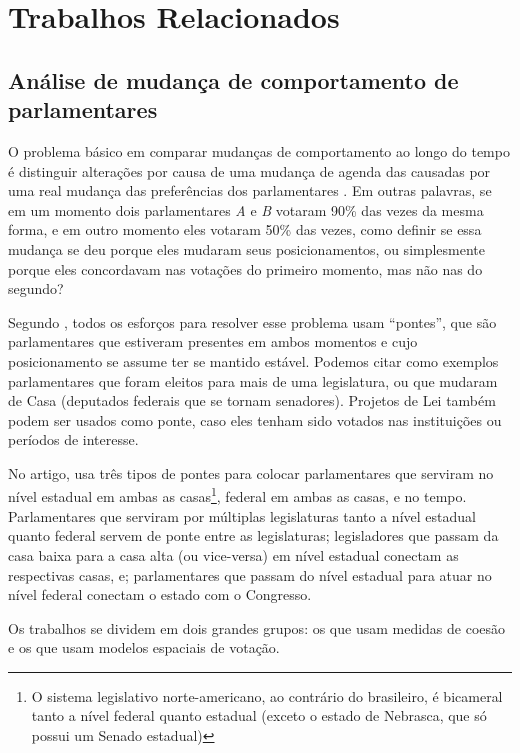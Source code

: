\chapter{Trabalhos Relacionados}\label{cap:relacionados}


\section{Análise de mudança de comportamento de parlamentares}

O problema básico em comparar mudanças de comportamento ao longo do tempo é
distinguir alterações por causa de uma mudança de agenda das causadas por uma
real mudança das preferências dos parlamentares \cite{Bailey2007}. Em outras
palavras, se em um momento dois parlamentares \emph{A} e \emph{B} votaram 90\%
das vezes da mesma forma, e em outro momento eles votaram 50\% das vezes, como
definir se essa mudança se deu porque eles mudaram seus posicionamentos, ou
simplesmente porque eles concordavam nas votações do primeiro momento, mas não
nas do segundo?

Segundo , todos os esforços para resolver esse problema
usam ``pontes'', que são parlamentares que estiveram presentes em ambos
momentos e cujo posicionamento se assume ter se mantido estável. Podemos citar
como exemplos parlamentares que foram eleitos para mais de uma legislatura, ou
que mudaram de Casa (deputados federais que se tornam senadores). Projetos de
Lei também podem ser usados como ponte, caso eles tenham sido votados nas
instituições ou períodos de interesse.

No artigo,  usa três tipos de pontes para colocar
parlamentares que serviram no nível estadual em ambas as casas\footnote{O
sistema legislativo norte-americano, ao contrário do brasileiro, é bicameral
tanto a nível federal quanto estadual (exceto o estado de Nebrasca, que só
possui um Senado estadual)}, federal em ambas as casas, e no tempo.
Parlamentares que serviram por múltiplas legislaturas tanto a nível estadual
quanto federal servem de ponte entre as legislaturas; legisladores que passam
da casa baixa para a casa alta (ou vice-versa) em nível estadual conectam as
respectivas casas, e; parlamentares que passam do nível estadual para atuar no
nível federal conectam o estado com o Congresso.

Os trabalhos se dividem em dois grandes grupos: os que usam medidas de coesão e
os que usam modelos espaciais de votação.


